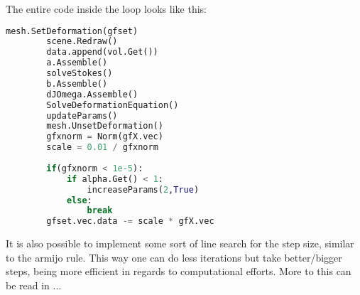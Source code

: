 The entire code inside the loop looks like this:

\begin{lstlisting}[language=Python, title=Iteration, label=lst:loop]
		mesh.SetDeformation(gfset)
		scene.Redraw()
		data.append(vol.Get())
		a.Assemble()
		solveStokes()
		b.Assemble()
		dJOmega.Assemble()
		SolveDeformationEquation()
		updateParams()
		mesh.UnsetDeformation()
		gfxnorm = Norm(gfX.vec)
		scale = 0.01 / gfxnorm
		
		if(gfxnorm < 1e-5):
			if alpha.Get() < 1:
				increaseParams(2,True)
			else:
				break
		gfset.vec.data -= scale * gfX.vec
\end{lstlisting}

It is also possible to implement some sort of line search for the step size, similar to the armijo rule. This way one can do less iterations but take better/bigger steps, being more efficient in regards to computational efforts. More to this can be read in ...
